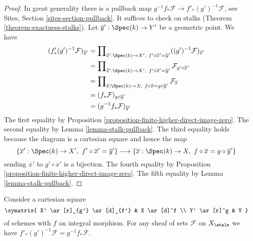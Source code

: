 \begin{proof}
In great generality there is a pullback map
$g^{-1}f_*\mathcal{F} \to f'_*(g')^{-1}\mathcal{F}$, see
Sites, Section \ref{sites-section-pullback}.
It suffices to check on stalks (Theorem \ref{theorem-exactness-stalks}).
Let $\overline{y}' : \Spec(k) \to Y'$ be a geometric point.
We have
\begin{align*}
(f'_*(g')^{-1}\mathcal{F})_{\overline{y}'}
& =
\prod\nolimits_{\overline{x}' : \Spec(k) \to X',\ f' \circ \overline{x}' =
\overline{y}'}
((g')^{-1}\mathcal{F})_{\overline{x}'} \\
& =
\prod\nolimits_{\overline{x}' : \Spec(k) \to X',\ f' \circ \overline{x}' =
\overline{y}'} \mathcal{F}_{g' \circ \overline{x}'} \\
& =
\prod\nolimits_{\overline{x} : \Spec(k) \to X,\ f \circ \overline{x} =
g \circ \overline{y}'} \mathcal{F}_{\overline{x}} \\
& =
(f_*\mathcal{F})_{g \circ \overline{y}'} \\
& =
(g^{-1}f_*\mathcal{F})_{\overline{y}'}
\end{align*}
The first equality by
Proposition \ref{proposition-finite-higher-direct-image-zero}.
The second equality by
Lemma \ref{lemma-stalk-pullback}.
The third equality holds because the diagram is a cartesian square
and hence the map
$$
\{\overline{x}' : \Spec(k) \to X',\ f' \circ \overline{x}' =
\overline{y}'\}
\longrightarrow
\{\overline{x} : \Spec(k) \to X,\ f \circ \overline{x} =
g \circ \overline{y}'\}
$$
sending $\overline{x}'$ to $g' \circ \overline{x}'$ is a bijection.
The fourth equality by
Proposition \ref{proposition-finite-higher-direct-image-zero}.
The fifth equality by
Lemma \ref{lemma-stalk-pullback}.
\end{proof}

\begin{lemma}
\label{lemma-integral-pushforward-commutes-with-base-change}
Consider a cartesian square
$$
\xymatrix{
X' \ar[r]_{g'} \ar[d]_{f'} & X \ar[d]^f \\
Y' \ar[r]^g & Y
}
$$
of schemes with $f$ an integral morphism.
For any sheaf of sets $\mathcal{F}$ on $X_\etale$ we have
$f'_*(g')^{-1}\mathcal{F} = g^{-1}f_*\mathcal{F}$.
\end{lemma}

